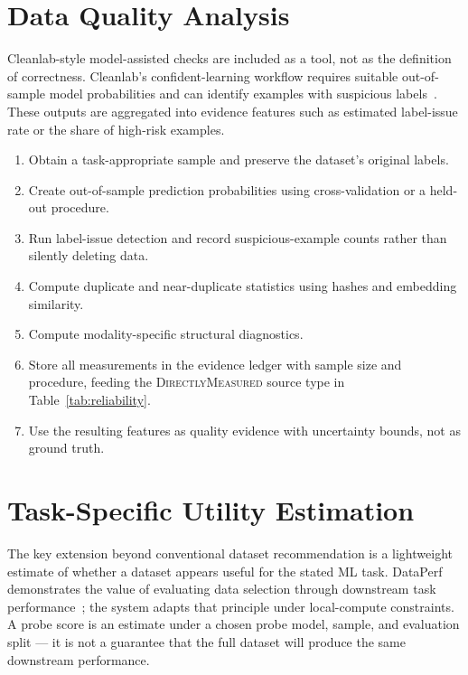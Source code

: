 \documentclass[11pt]{article}
\begin{document}
\section{Data Quality Analysis}
Cleanlab-style model-assisted checks are included as a tool, not as the definition of correctness.
Cleanlab's confident-learning workflow requires suitable out-of-sample model probabilities and can
identify examples with suspicious labels~\cite{cleanlab}. These outputs are aggregated into evidence
features such as estimated label-issue rate or the share of high-risk examples.

\begin{enumerate}[leftmargin=*]
\item Obtain a task-appropriate sample and preserve the dataset's original labels.
\item Create out-of-sample prediction probabilities using cross-validation or a held-out procedure.
\item Run label-issue detection and record suspicious-example counts rather than silently deleting data.
\item Compute duplicate and near-duplicate statistics using hashes and embedding similarity.
\item Compute modality-specific structural diagnostics.
\item Store all measurements in the evidence ledger with sample size and procedure, feeding the
      \textsc{DirectlyMeasured} source type in Table~\ref{tab:reliability}.
\item Use the resulting features as quality evidence with uncertainty bounds, not as ground truth.
\end{enumerate}

\section{Task-Specific Utility Estimation}
The key extension beyond conventional dataset recommendation is a lightweight estimate of whether a
dataset appears useful for the stated ML task. DataPerf demonstrates the value of evaluating data
selection through downstream task performance~\cite{dataperf}; the system adapts that principle under
local-compute constraints. A probe score is an estimate under a chosen probe model, sample, and evaluation
split --- it is not a guarantee that the full dataset will produce the same downstream performance.
\end{document}
